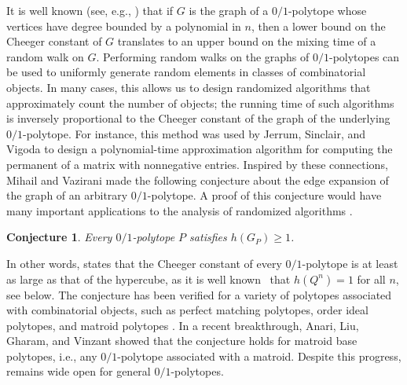 \documentclass[11pt,a4paper,oneside,reqno]{amsart}
\newtheorem{conjecture}[theorem]{Conjecture}
\begin{document}
It is well known (see, e.g., \cites{expansionpolysurvey92, markovchain96}) that if $G$ is the graph of a $0/1$-polytope whose vertices have degree bounded by a polynomial in $n$, then a lower bound on the Cheeger constant of $G$ translates to an upper bound on the mixing time of a random walk on $G$.
Performing random walks on the graphs of $0/1$-polytopes can be used to uniformly generate random elements in classes of combinatorial objects.
In many cases, this allows us to design randomized algorithms that approximately count the number of objects; the running time of such algorithms is inversely proportional to the Cheeger constant of the graph of the underlying $0/1$-polytope.
For instance, this method was used by Jerrum, Sinclair, and Vigoda \cites{mixingapplication89, mixingapplication04} to design a polynomial-time approximation algorithm for computing the permanent of a matrix with nonnegative entries. 
Inspired by these connections, Mihail and Vazirani \cites{expansionpolysurvey92, mihailvaziraniconj92} made the following conjecture about the edge expansion of the graph of an arbitrary $0/1$-polytope.
A proof of this conjecture would have many important applications to the analysis of randomized algorithms \cites{mihailvaziraniconj92, gillmannthesis07, expansionpolytope04}.

\begin{conjecture}\label{conj:mihailvazirani}
  Every $0/1$-polytope $P$ satisfies $h(G_P) \geq 1$.
\end{conjecture}

In other words,  states that the Cheeger constant of every $0/1$-polytope is at least as large as that of the hypercube, as it is well known~\cites{Harper64 ,B67, Hart76, Lindsey64} that $h(Q^n) = 1$ for all $n$, see  below.  The conjecture has been verified for a variety of polytopes associated with combinatorial objects, such as perfect matching polytopes, order ideal polytopes, and matroid polytopes \cites{expansionpolytope04, mihailthesis89}.  In a recent breakthrough, Anari, Liu, Gharam, and Vinzant \cite{expansionpolytope24} showed that the conjecture holds for matroid base polytopes, i.e., any $0/1$-polytope associated with a matroid. Despite this progress,  remains wide open for general $0/1$-polytopes.
\end{document}
